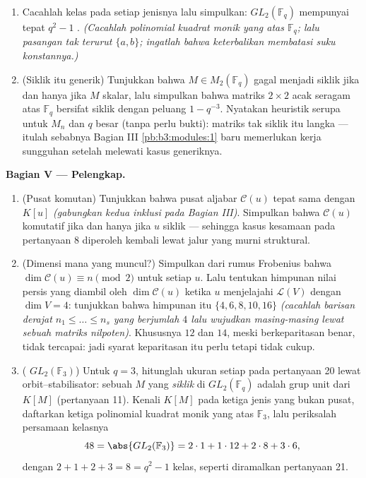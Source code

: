 \begin{problem}
\begin{enumerate}[resume]
  \item Cacahlah kelas pada setiap jenisnya lalu simpulkan:
        $GL_2(\mathbb F_q)$ mempunyai tepat $q^2 - 1$ . \emph{(Cacahlah polinomial kuadrat monik yang  atas
        $\mathbb F_q$; lalu pasangan tak terurut $\{a, b\}$; ingatlah bahwa
        keterbalikan membatasi suku konstannya.)}
  \item (Siklik itu generik) Tunjukkan bahwa $M \in M_2(\mathbb F_q)$
        gagal menjadi siklik jika dan hanya jika $M$ skalar, lalu simpulkan bahwa
        matriks $2\times2$ acak seragam atas $\mathbb F_q$ bersifat
        siklik dengan peluang $1 - q^{-3}$. Nyatakan heuristik
        serupa untuk $M_n$ dan $q$ besar (tanpa perlu bukti):
        matriks tak siklik itu langka --- itulah sebabnya
        Bagian III \cref{pb:b3:modules:1} baru memerlukan kerja sungguhan
        setelah melewati kasus generiknya.
\end{enumerate}

\medskip
\noindent\textbf{Bagian V --- Pelengkap.}
\begin{enumerate}[resume]
  \item (Pusat komutan) Tunjukkan bahwa pusat aljabar
        $\mathcal C(u)$ tepat sama dengan $K[u]$ \emph{(gabungkan
        kedua inklusi pada Bagian III)}. Simpulkan bahwa
        $\mathcal C(u)$ komutatif jika dan hanya jika $u$ siklik ---
        sehingga kasus kesamaan pada pertanyaan 8 diperoleh kembali lewat jalur
        yang murni struktural.
  \item (Dimensi mana yang muncul?) Simpulkan dari rumus
        Frobenius bahwa $\dim\mathcal C(u) \equiv n \pmod 2$ untuk
        setiap $u$. Lalu tentukan himpunan nilai persis yang diambil
        oleh $\dim \mathcal C(u)$ ketika $u$ menjelajahi
        $\mathcal L(V)$ dengan $\dim V = 4$: tunjukkan bahwa himpunan itu $\{4, 6,
        8, 10, 16\}$ \emph{(cacahlah barisan derajat $n_1
        \leq \dots \leq n_s$ yang berjumlah $4$ lalu wujudkan masing-masing lewat
        sebuah matriks nilpoten)}. Khususnya $12$ dan $14$, meski
        berkeparitasan benar, tidak tercapai: jadi syarat keparitasan
        itu perlu tetapi tidak cukup.
  \item ( $GL_2(\mathbb F_3)$) Untuk $q = 3$,
        hitunglah ukuran setiap  pada pertanyaan 20
        lewat orbit--stabilisator:  sebuah $M$ yang
        \emph{siklik} di $GL_2(\mathbb F_q)$ adalah grup unit
        dari $K[M]$ (pertanyaan 11). Kenali $K[M]$ pada
        ketiga jenis yang bukan pusat, daftarkan ketiga polinomial kuadrat
        monik yang  atas $\mathbb F_3$, lalu periksalah persamaan
        kelasnya
        \[
        48 = \abs{GL_2(\mathbb F_3)}
        = 2\cdot1 + 1\cdot12 + 2\cdot8 + 3\cdot6,
        \]
        dengan $2 + 1 + 2 + 3 = 8 = q^2 - 1$ kelas, seperti
        diramalkan pertanyaan 21.


\end{enumerate}
\end{problem}
